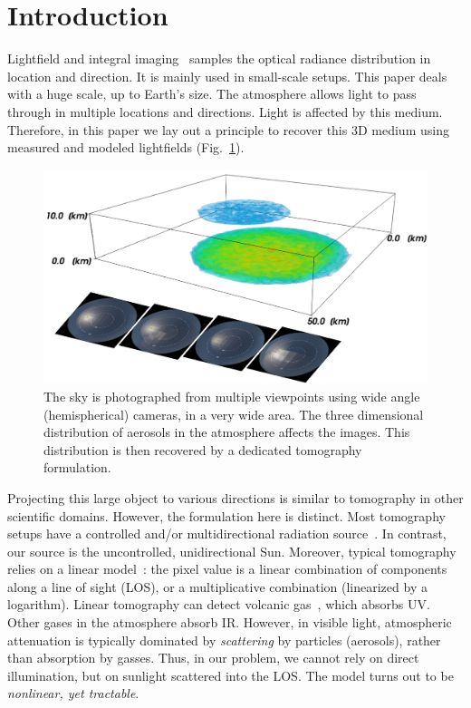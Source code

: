 \documentclass[10pt,letterpaper]{article}
\newcommand{\yoavcomment}[1]{}
\renewcommand{\yoavcomment}[1]{#1} %
\begin{document}
{}



\section{Introduction}
\label{sec:intro}

Lightfield and integral imaging~\cite{bishop,horstmeyer,kim,Ng1948}
samples the optical radiance distribution in location and
direction. It is mainly used in small-scale setups. This paper deals
with a huge scale, up to Earth's size.  The atmosphere allows light to
pass through in multiple locations and directions. Light is affected
by this medium. Therefore, in this paper we lay out a principle to
recover this 3D medium using measured and modeled lightfields
(Fig.~\ref{fig:front}).
\begin{figure}[t!]
  \centering
  \yoavcomment{\includegraphics[width=\columnwidth]{images/front_img.pdf}}
  \caption{\small The sky is photographed from multiple viewpoints
    using wide angle (hemispherical) cameras, in a very wide area. The
    three dimensional distribution of aerosols in the atmosphere
    affects the images. This distribution is then recovered by a
    dedicated tomography formulation.}
  \label{fig:front}
\end{figure}

Projecting this large object to various directions is similar to
tomography in other scientific domains. However, the formulation here
is distinct. Most tomography setups have a controlled and/or
multidirectional radiation source~\cite{gorbunov,messer}. In contrast,
our source is the uncontrolled, unidirectional Sun. Moreover, typical
tomography relies on a linear model~\cite{gregson}: the pixel value is
a linear combination of components along a line of sight (LOS), or a
multiplicative combination (linearized by a logarithm). Linear
tomography can detect volcanic gas~\cite{wright}, which absorbs
UV. Other gases in the atmosphere absorb IR. However, in visible
light, atmospheric attenuation is typically dominated by {\em
  scattering} by particles (aerosols), rather than absorption by
gasses. Thus, in our problem, we cannot rely on direct illumination,
but on sunlight scattered into the LOS.  The model turns out to be
{\em nonlinear, yet tractable}.
\end{document}
